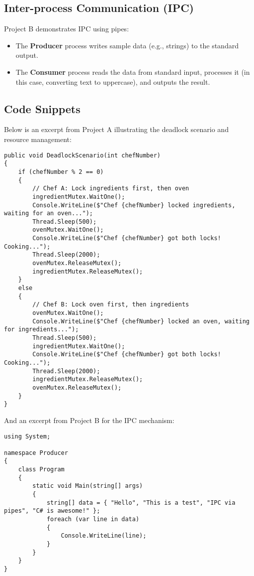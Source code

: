 \documentclass[12pt]{article}
\begin{document}
\subsection{Inter-process Communication (IPC)}
Project B demonstrates IPC using pipes:
\begin{itemize}
    \item The \textbf{Producer} process writes sample data (e.g., strings) to the standard output.
    \item The \textbf{Consumer} process reads the data from standard input, processes it (in this case, converting text to uppercase), and outputs the result.
\end{itemize}

\subsection{Code Snippets}
Below is an excerpt from Project A illustrating the deadlock scenario and resource management:
\begin{lstlisting}[caption={Deadlock Scenario in Project A}, label={lst:deadlock}]
public void DeadlockScenario(int chefNumber)
{
    if (chefNumber % 2 == 0)
    {
        // Chef A: Lock ingredients first, then oven
        ingredientMutex.WaitOne();
        Console.WriteLine($"Chef {chefNumber} locked ingredients, waiting for an oven...");
        Thread.Sleep(500);
        ovenMutex.WaitOne();
        Console.WriteLine($"Chef {chefNumber} got both locks! Cooking...");
        Thread.Sleep(2000);
        ovenMutex.ReleaseMutex();
        ingredientMutex.ReleaseMutex();
    }
    else
    {
        // Chef B: Lock oven first, then ingredients
        ovenMutex.WaitOne();
        Console.WriteLine($"Chef {chefNumber} locked an oven, waiting for ingredients...");
        Thread.Sleep(500);
        ingredientMutex.WaitOne();
        Console.WriteLine($"Chef {chefNumber} got both locks! Cooking...");
        Thread.Sleep(2000);
        ingredientMutex.ReleaseMutex();
        ovenMutex.ReleaseMutex();
    }
}
\end{lstlisting}

And an excerpt from Project B for the IPC mechanism:
\begin{lstlisting}[caption={Producer Code in Project B}, label={lst:producer}]
using System;

namespace Producer
{
    class Program
    {
        static void Main(string[] args)
        {
            string[] data = { "Hello", "This is a test", "IPC via pipes", "C# is awesome!" };
            foreach (var line in data)
            {
                Console.WriteLine(line);
            }
        }
    }
}
\end{lstlisting}
\end{document}
